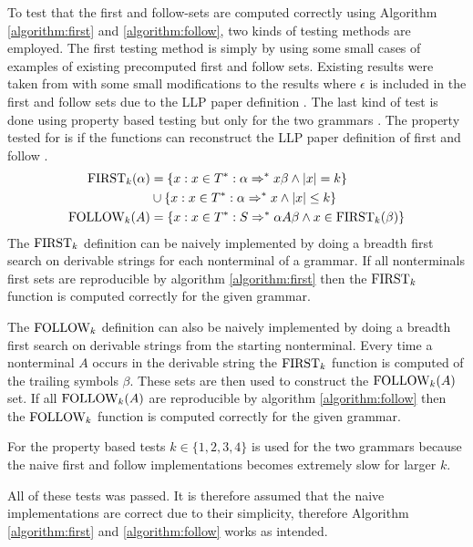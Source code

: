 To test that the first and follow-sets are computed correctly using Algorithm \ref{algorithm:first} and \ref{algorithm:follow}, two kinds of testing methods are employed. The first testing method is simply by using some small cases of examples of existing precomputed first and follow sets. Existing results were taken from \cite[58, 62, 63, 65]{Mogensen} with some small modifications to the results where $\epsilon$ is included in the first and follow sets due to the LLP paper definition \cite[5]{Vagner2007}. The last kind of test is done using property based testing but only for the two grammars \cite[62, 63]{Mogensen}. The property tested for is if the functions can reconstruct the LLP paper definition of first and follow \cite[5]{Vagner2007}.
\begin{align*}
    \text{FIRST}_k(\alpha) &= \{x : x \in T^* : \alpha \Rightarrow^* x \beta \land |x| = k\} \\ 
    \, &\cup \{x : x \in T^* : \alpha \Rightarrow^* x \land |x| \leq k\} \\
    \text{FOLLOW}_k(A) &= \{x : x \in T^* : S \Rightarrow^* \alpha A \beta \land x \in \text{FIRST}_k(\beta)\}
\end{align*}
The $\text{FIRST}_k$ definition can be naively implemented by doing a breadth first search on derivable strings for each nonterminal of a grammar. If all nonterminals first sets are reproducible by algorithm \ref{algorithm:first} then the $\text{FIRST}_k$ function is computed correctly for the given grammar.

The $\text{FOLLOW}_k$ definition can also be naively implemented by doing a breadth first search on derivable strings from the starting nonterminal. Every time a nonterminal $A$ occurs in the derivable string the $\text{FIRST}_k$ function is computed of the trailing symbols $\beta$. These sets are then used to construct the $\text{FOLLOW}_k(A)$ set. If all $\text{FOLLOW}_k(A)$ are reproducible by algorithm \ref{algorithm:follow} then the $\text{FOLLOW}_k$ function is computed correctly for the given grammar.

For the property based tests $k \in \{1, 2, 3, 4\}$ is used for the two grammars because the naive first and follow implementations becomes extremely slow for larger $k$.

All of these tests was passed. It is therefore assumed that the naive implementations are correct due to their simplicity, therefore Algorithm \ref{algorithm:first} and \ref{algorithm:follow} works as intended.